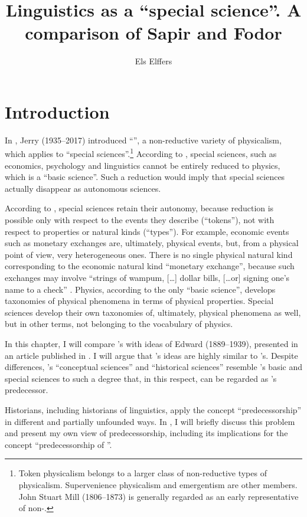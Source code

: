 \documentclass[output=paper]{langscibook}
\author{Els Elffers}
\title{Linguistics as a ``special science''. A comparison of Sapir and Fodor}
\begin{document}
\maketitle

\section{Introduction} 
\label{sec:elffers:intro}
In \citeyear{Fodor1974}, Jerry {\Fodor} (1935--2017) introduced ``'', a non-reductive variety of physicalism, which applies to ``special sciences''.\footnote{Token physicalism belongs to a larger class of non-reductive types of physicalism. Supervenience physicalism and emergentism are other members. John Stuart Mill (1806--1873) is generally regarded as an early representative of non-.} According to {\Fodor}, special sciences, such as economics, psychology and linguistics cannot be entirely reduced to physics, which is a ``basic science''. Such a reduction would imply that special sciences actually disappear as autonomous sciences. 

According to {\Fodor}, special sciences retain their autonomy, because reduction is possible only with respect to the events they describe (``tokens''), not with respect to properties or natural kinds (``types''). For example, economic events such as monetary exchanges are, ultimately, physical events, but, from a physical point of view, very heterogeneous ones. There is no single physical natural kind corresponding to the economic natural kind ``monetary exchange'', because such exchanges may involve ``strings of wampum, […] dollar bills, […or] signing one's name to a check'' \citep[103]{Fodor1974}. Physics, according to {\Fodor} the only ``basic science'', develops taxonomies of physical phenomena in terms of physical properties. Special sciences develop their own taxonomies of, ultimately, physical phenomena as well, but in other terms, not belonging to the vocabulary of physics.

In this chapter, I will compare {\Fodor}'s  with ideas of Edward {\Sapir} (1889--1939), presented in an article published in \citeyear{Sapir1917}. I will argue that {\Sapir}'s ideas are highly similar to {\Fodor}'s. Despite differences, {\Sapir}'s ``conceptual sciences'' and ``historical sciences'' resemble {\Fodor}'s basic and special sciences to such a degree that, in this respect, {\Sapir} can be regarded as {\Fodor}'s predecessor.

Historians, including historians of linguistics, apply the concept ``predecessorship'' in different and partially unfounded ways. In , I will briefly discuss this problem and present my own view of predecessorship, including its implications for the concept ``predecessorship of ''.
\end{document}
